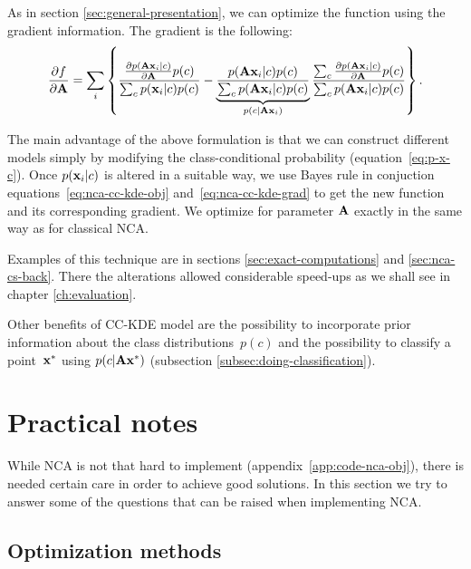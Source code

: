 	As in section \ref{sec:general-presentation}, we can optimize the function using the gradient information. The gradient is the following:
	\begin{align}
	    \frac{\partial f}{\partial \mathbf{A}} =
	      \sum_i \left\{
	                \frac
	                {
	                    \frac{\partial p(\mathbf{A}\mathbf{x}_i|c)}{\partial \mathbf{A}}p(c)
	                }
	                {
	                    \sum_c p(\mathbf{x}_i|c)p(c)
	                }
	                - \underbrace{\frac{
	                    p(\mathbf{A}\mathbf{x}_i|c)p(c)
	                }{
	                    \sum_c p(\mathbf{A}\mathbf{x}_i|c)p(c)
	                }}_{p(c|\mathbf{A}\mathbf{x}_i)}
	                \frac{
	                    \sum_c \frac{\partial p(\mathbf{A}\mathbf{x}_i|c)}{\partial \mathbf{A}}p(c)
	                }{
	                    \sum_c p(\mathbf{A}\mathbf{x}_i|c)p(c)
	                }
	             \right \}.
	    \label{eq:nca-cc-kde-grad}
	\end{align}

	The main advantage of the above formulation is that we can construct different models simply by modifying the class-conditional probability (equation~\eqref{eq:p-x-c}). Once $p(\mathbf{x}_i|c)$ is altered in a suitable way, we use Bayes rule in conjuction equations~\eqref{eq:nca-cc-kde-obj} and~\eqref{eq:nca-cc-kde-grad} to get the new function and its corresponding gradient. We optimize for parameter $\mathbf{A}$ exactly in the same way as for classical NCA.
	
	Examples of this technique are in sections \ref{sec:exact-computations} and \ref{sec:nca-cs-back}. There the alterations allowed considerable speed-ups as we shall see in chapter \ref{ch:evaluation}. 

	Other benefits of CC-KDE model are the possibility to incorporate prior information about the class distributions~$p(c)$ and the possibility to classify a point~$\mathbf{x}^*$ using $p(c|\mathbf{A}\mathbf{x}^*)$ (subsection \ref{subsec:doing-classification}).

\section{Practical notes}
\label{sec:practical-notes}

	While NCA is not that hard to implement (appendix~\ref{app:code-nca-obj}), there is needed certain care
	in order to achieve good solutions.
	In this section we try to answer some of the questions 
	that can be raised when implementing NCA. 	

\subsection{Optimization methods}
\label{subsec:optimization}

